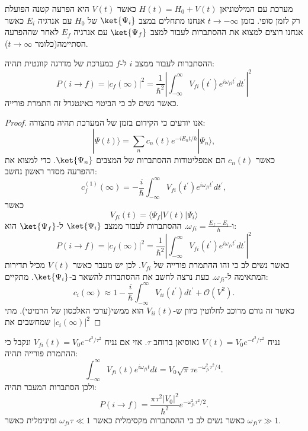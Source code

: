 \documentclass{tstextbook}
\begin{document}
\begin{definition}
מערכת עם המילטוניאן \(H(t)=H_{0}+V(t)\) כאשר \(V(t)\) היא הפרעה קטנה הפועלת רק לזמן סופי. בזמן \(t \to -\infty\) אנחנו מתחלים במצב \(\ket{\Psi_{i}}\) של \(H_{0}\) עם אנרגיה \(E_{i}\) כאשר אנחנו רוצים למצוא את ההסתברות לעבור למצב \(\ket{\Psi_{f}}\) עם אנרגיה \(E_{f}\) לאחר שההפרעה הסתיימה(כלומר \(t \to \infty\)).

\end{definition}
\begin{proposition}
ההסתברות לעבור ממצב \(i\) ל-\(f\) במערכת של מדרגה קוונטית תהיה:
$$P(i\to f)=|c_{f}(\infty)|^{2}={\frac{1}{\hbar^{2}}}\left|\int_{-\infty}^{\infty}V_{f i}(t^{\prime})e^{i\omega_{f i}t^{\prime}}d t^{\prime}\right|^{2}$$
כאשר נשים לב כי הביטוי באינטגרל זה התמרת פורייה.

\end{proposition}
\begin{proof}
אנו יודעים כי הקידום בזמן של המערכת תהיה מהצורה:
$$|\Psi(t)\rangle=\sum_{n}c_{n}(t)e^{-i E_{n}t/\hbar}|\Psi_{n}\rangle,$$
כאשר \(c_{n}(t)\) הם אמפליטודות ההסתברות של המצבים \(\ket{\Psi_{n}}\). כדי למצוא את ההפרעה מסדר ראשון נחשב:
$$c_{f}^{(1)}(\infty)=-\frac{i}{\hbar}\int_{-\infty}^{\infty}V_{f i}(t^{\prime})e^{i\omega_{f i}t^{\prime}}d t^{\prime},$$
כאשר 
$$V_{f i}(t)=\langle\Psi_{f}|V(t)|\Psi_{i}\rangle$$
ו-\(\omega_{fi}=\frac{E_{f}-E_{i}}{\hbar}\). ההסתברות לעבור ממצב \(\ket{\Psi_{i}}\) ל-\(\ket{\Psi_{f}}\) הוא:
$$P(i\to f)=|c_{f}(\infty)|^{2}={\frac{1}{\hbar^{2}}}\left|\int_{-\infty}^{\infty}V_{f i}(t^{\prime})e^{i\omega_{f i}t^{\prime}}d t^{\prime}\right|^{2}$$
כאשר נשים לב כי זהו ההתמרת פורייה של \(V_{fi}\).  לכן יש מעבר כאשר \(V(t)\) מכיל תדירות המתאימה ל-\(\omega_{fi}\). כעת נרצה לחשב את ההסתברות להשאר ב-\(\ket{\Psi_{i}}\). מתקיים:
$$c_{i}(\infty)\approx1-\frac{i}{\hbar}\int_{-\infty}^{\infty}V_{i i}(t^{\prime})d t^{\prime}+\mathcal{O}(V^{2}).$$
כאשר זה גורם מרוכב לחלוטין כיוון ש-\(V_{ii}(t)\) הוא ממשי(ערכי האלכסון של הרמיטי). מתי שמחשבים את \(\left\lvert  c_{i}\left( \infty \right)  \right\rvert^{2}\)

\end{proof}
\begin{example}
נניח \(V(t)=V_{0}e^{-t^{2}/\tau^{2}}\) גאוסיאן ברוחב \(\tau\). אזי אם נניח \(V_{fi}(t)=V_{0}e^{ -t^{2} / \tau^{2} }\) ונקבל כי ההתמרת פורייה תהיה:
$$\int_{-\infty}^{\infty}V_{f i}(t)e^{i\omega_{f i}t}d t=V_{0}\sqrt{\pi}\tau e^{-\omega_{f i}^{2}\tau^{2}/4}.$$
ולכן הסתברות המעבר תהיה:
$$P(i\to f)=\frac{\pi\tau^{2}|V_{0}|^{2}}{\hbar^{2}}e^{-\omega_{f i}^{2}\tau^{2}/2}.$$
כאשר נשים לב כי ההסתברות מקסימלית כאשר \(\omega_{fi}\tau\ll 1\) ומינימלית כאשר \(\omega_{fi}\tau \gg 1\).

\end{example}
\end{document}
